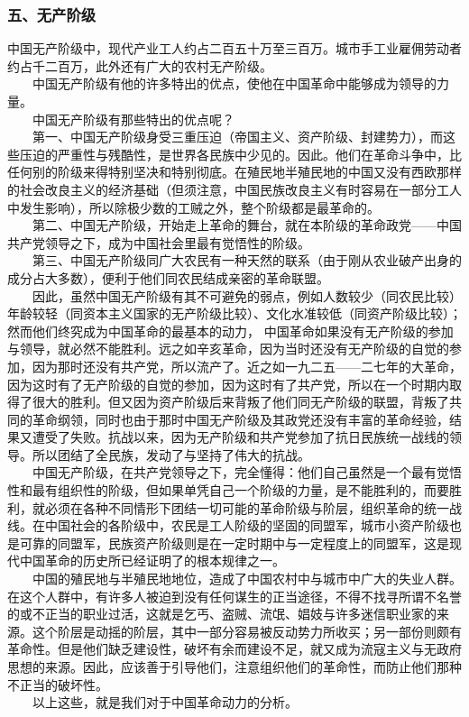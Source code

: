 \documentclass[cn,11pt,chinese]{elegantbook}
\def\myformat#1{\hfil\hfil #1}
\begin{document}
\subsubsection*{\myformat{五、无产阶级}}
中国无产阶级中，现代产业工人约占二百五十万至三百万。城市手工业雇佣劳动者约占千二百万，此外还有广大的农村无产阶级。\\
　　中国无产阶级有他的许多特出的优点，使他在中国革命中能够成为领导的力量。\\
　　中国无产阶级有那些特出的优点呢？\\
　　第一、中国无产阶级身受三重压迫（帝国主义、资产阶级、封建势力），而这些压迫的严重性与残酷性，是世界各民族中少见的。因此。他们在革命斗争中，比任何别的阶级来得特别坚决和特别彻底。在殖民地半殖民地的中国又没有西欧那样的社会改良主义的经济基础（但须注意，中国民族改良主义有时容易在一部分工人中发生影响），所以除极少数的工贼之外，整个阶级都是最革命的。\\
　　第二、中国无产阶级，开始走上革命的舞台，就在本阶级的革命政党——中国共产党领导之下，成为中国社会里最有觉悟性的阶级。\\
　　第三、中国无产阶级同广大农民有一种天然的联系（由于刚从农业破产出身的成分占大多数），便利于他们同农民结成亲密的革命联盟。\\
　　因此，虽然中国无产阶级有其不可避免的弱点，例如人数较少（同农民比较）年龄较轻（同资本主义国家的无产阶级比较）、文化水准较低（同资产阶级比较）；然而他们终究成为中国革命的最基本的动力， 中国革命如果没有无产阶级的参加与领导，就必然不能胜利。远之如辛亥革命，因为当时还没有无产阶级的自觉的参加，因为那时还没有共产党，所以流产了。近之如一九二五——二七年的大革命，因为这时有了无产阶级的自觉的参加，因为这时有了共产党，所以在一个时期内取得了很大的胜利。但又因为资产阶级后来背叛了他们同无产阶级的联盟，背叛了共同的革命纲领，同时也由于那时中国无产阶级及其政党还没有丰富的革命经验，结果又遭受了失败。抗战以来，因为无产阶级和共产党参加了抗日民族统一战线的领导。所以团结了全民族，发动了与坚持了伟大的抗战。\\
　　中国无产阶级，在共产党领导之下，完全懂得：他们自己虽然是一个最有觉悟性和最有组织性的阶级，但如果单凭自己一个阶级的力量，是不能胜利的，而要胜利，就必须在各种不同情形下团结一切可能的革命阶级与阶层，组织革命的统一战线。在中国社会的各阶级中，农民是工人阶级的坚固的同盟军，城市小资产阶级也是可靠的同盟军，民族资产阶级则是在一定时期中与一定程度上的同盟军，这是现代中国革命的历史所已经证明了的根本规律之一。\\
　　中国的殖民地与半殖民地地位，造成了中国农村中与城市中广大的失业人群。在这个人群中，有许多人被迫到没有任何谋生的正当途径，不得不找寻所谓不名誉的或不正当的职业过活，这就是乞丐、盗贼、流氓、娼妓与许多迷信职业家的来源。这个阶层是动摇的阶层，其中一部分容易被反动势力所收买；另一部份则颇有革命性。但是他们缺乏建设性，破坏有余而建设不足，就又成为流寇主义与无政府思想的来源。因此，应该善于引导他们，注意组织他们的革命性，而防止他们那种不正当的破坏性。\\
　　以上这些，就是我们对于中国革命动力的分析。\\
\end{document}
